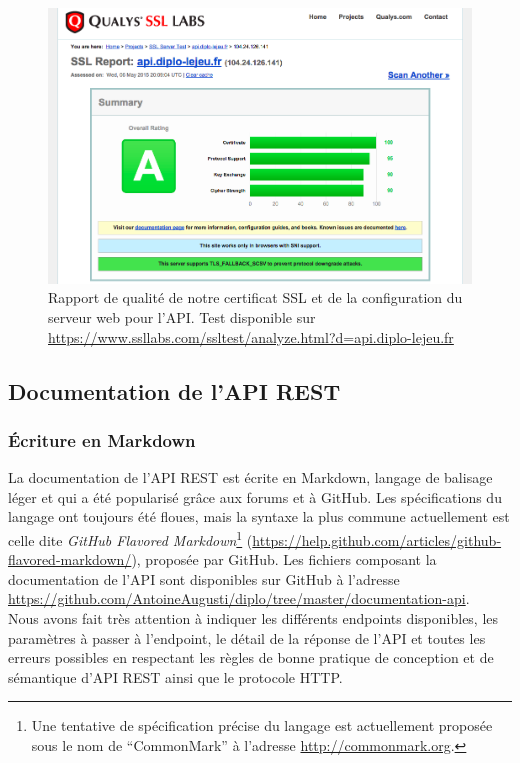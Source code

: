 		\begin{figure}[H]
			\centering
			\includegraphics[width=1\textwidth]{images/qualite-ssl.png}
			\caption{Rapport de qualité de notre certificat SSL et de la configuration du serveur web pour l'API. Test disponible sur \url{https://www.ssllabs.com/ssltest/analyze.html?d=api.diplo-lejeu.fr}}
			\label{fig:qualite-ssl}
		\end{figure}

	\subsection{Documentation de l'API REST}
		\subsubsection{Écriture en Markdown}
			La documentation de l'API REST est écrite en Markdown, langage de balisage léger et qui a été popularisé grâce aux forums et à GitHub. Les spécifications du langage ont toujours été floues, mais la syntaxe la plus commune actuellement est celle dite \textit{GitHub Flavored Markdown}\footnote{Une tentative de spécification précise du langage est actuellement proposée sous le nom de \enquote{CommonMark} à l'adresse \url{http://commonmark.org}.} (\url{https://help.github.com/articles/github-flavored-markdown/}), proposée par GitHub. Les fichiers composant la documentation de l'API sont disponibles sur GitHub à l'adresse \url{https://github.com/AntoineAugusti/diplo/tree/master/documentation-api}.\\

			Nous avons fait très attention à indiquer les différents endpoints disponibles, les paramètres à passer à l'endpoint, le détail de la réponse de l'API et toutes les erreurs possibles en respectant les règles de bonne pratique de conception et de sémantique d'API REST ainsi que le protocole HTTP.

